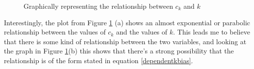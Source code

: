 \documentclass[12pt]{report}
\begin{document}
\begin{figure}
\caption{Graphically representing the relationship between $c_{k}$ and $k$} \label{c_k_normal}
\end{figure}

Interestingly, the plot from Figure \ref{c_k_normal} (a) shows an almost exponential or parabolic relationship between the values of $c_{k}$ and the values of $k$. This leads me to believe that there is some kind of relationship between the two variables, and looking at the graph in Figure \ref{c_k_normal}(b) this shows that there's a strong possibility that the relationship is of the form stated in equation \ref{dependentkbias}.
\end{document}

